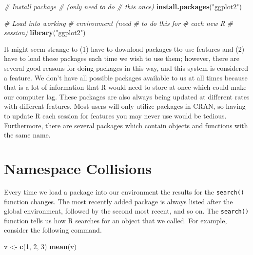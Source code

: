\documentclass[
]{book}
\newenvironment{Shaded}{\begin{snugshade}}{\end{snugshade}}
\newcommand{\CommentTok}[1]{\textcolor[rgb]{0.56,0.35,0.01}{\textit{#1}}}
\newcommand{\DecValTok}[1]{\textcolor[rgb]{0.00,0.00,0.81}{#1}}
\newcommand{\KeywordTok}[1]{\textcolor[rgb]{0.13,0.29,0.53}{\textbf{#1}}}
\newcommand{\NormalTok}[1]{#1}
\newcommand{\StringTok}[1]{\textcolor[rgb]{0.31,0.60,0.02}{#1}}
\begin{document}
\begin{Shaded}
\begin{Highlighting}[]
\CommentTok{# Install package}
\CommentTok{# (only need to do}
\CommentTok{# this once)}
\KeywordTok{install.packages}\NormalTok{(}\StringTok{"ggplot2"}\NormalTok{)}

\CommentTok{# Load into working}
\CommentTok{# environment (need}
\CommentTok{# to do this for}
\CommentTok{# each new R}
\CommentTok{# session)}
\KeywordTok{library}\NormalTok{(}\StringTok{"ggplot2"}\NormalTok{)}
\end{Highlighting}
\end{Shaded}

It might seem strange to (1) have to download packages tto use features and (2) have to load these packages each time we wish to use them; however, there are several good reasons for doing packages in this way, and this system is considered a feature. We don't have all possible packages available to us at all times because that is a lot of information that R would need to store at once which could make our computer lag. These packages are also always being updated at different rates with different features. Most users will only utilize packages in CRAN, so having to update R each session for features you may never use would be tedious. Furthermore, there are several packages which contain objects and functions with the same name.

\hypertarget{namespace-collisions}{%
\section{Namespace Collisions}\label{namespace-collisions}}

Every time we load a package into our environment the results for the \texttt{search()} function changes. The most recently added package is always listed after the global environment, followed by the second most recent, and so on.
The \texttt{search()} function tells us how R searches for an object that we called. For example, consider the following command.

\begin{Shaded}
\begin{Highlighting}[]
\NormalTok{v <-}\StringTok{ }\KeywordTok{c}\NormalTok{(}\DecValTok{1}\NormalTok{, }\DecValTok{2}\NormalTok{, }\DecValTok{3}\NormalTok{)}
\KeywordTok{mean}\NormalTok{(v)}
\end{Highlighting}
\end{Shaded}
\end{document}
